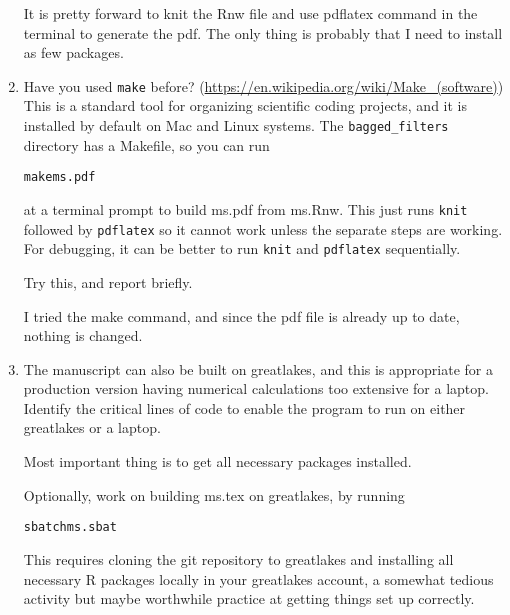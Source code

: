 \documentclass[12pt]{article}\usepackage[]{graphicx}\usepackage[]{color}
\makeatletter
\newenvironment{kframe}{%
 \def\at@end@of@kframe{}%
 \ifinner\ifhmode%
  \def\at@end@of@kframe{\end{minipage}}%
  \begin{minipage}{\columnwidth}%
 \fi\fi%
 \def\FrameCommand##1{\hskip\@totalleftmargin \hskip-\fboxsep
 \colorbox{shadecolor}{##1}\hskip-\fboxsep
     \hskip-\linewidth \hskip-\@totalleftmargin \hskip\columnwidth}%
 \MakeFramed {\advance\hsize-\width
   \@totalleftmargin\z@ \linewidth\hsize
   \@setminipage}}%
 {\par\unskip\endMakeFramed%
 \at@end@of@kframe}
\newenvironment{knitrout}{}{} %
\makeatother
\begin{document}
\begin{enumerate}
It is pretty forward to knit the Rnw file and use pdflatex command in the terminal to generate the pdf. The only thing is probably that I need to install as few packages.

\item Have you used \texttt{make} before? (\url{https://en.wikipedia.org/wiki/Make_(software)}) This is a standard tool for organizing scientific coding projects, and it is installed by default on Mac and Linux systems. The \texttt{bagged\_filters} directory has a Makefile, so you can run
\begin{knitrout}
\color{fgcolor}\begin{kframe}
\begin{alltt}
make ms.pdf
\end{alltt}
\end{kframe}
\end{knitrout}
at a terminal prompt to build ms.pdf from ms.Rnw. This just runs \texttt{knit} followed by \texttt{pdflatex} so it cannot work unless the separate steps are working. For debugging, it can be better to run \texttt{knit} and \texttt{pdflatex} sequentially.

Try this, and report briefly.

I tried the make command, and since the pdf file is already up to date, nothing is changed. 

\item The manuscript can also be built on greatlakes, and this is appropriate for a production version having numerical calculations too extensive for a laptop. Identify the critical lines of code to enable the program to run on either greatlakes or a laptop.

Most important thing is to get all necessary packages installed.

Optionally, work on building ms.tex on greatlakes, by running
\begin{knitrout}
\color{fgcolor}\begin{kframe}
\begin{alltt}
sbatch ms.sbat
\end{alltt}
\end{kframe}
\end{knitrout}
This requires cloning the git repository to greatlakes and installing all necessary R packages locally in your greatlakes account, a somewhat tedious activity but maybe worthwhile practice at getting things set up correctly.


\end{enumerate}
\end{document}
